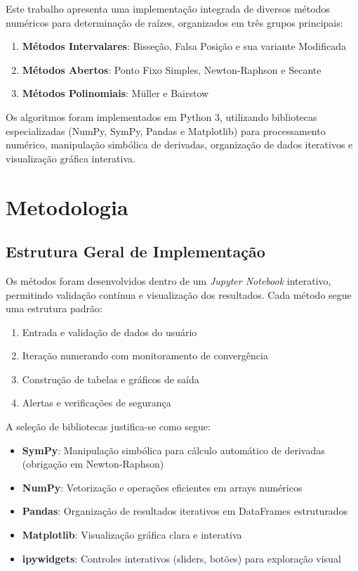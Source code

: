 \documentclass[
	12pt,				%
	openright,			%
	oneside,			%
	a4paper,			%
	english,			%
	brazil				%
	]{abntex2}
\begin{document}
Este trabalho apresenta uma implementação integrada de diversos métodos numéricos para determinação de raízes, organizados em três grupos principais:

\begin{enumerate}
    \item \textbf{Métodos Intervalares}: Bisseção, Falsa Posição e sua variante Modificada
    \item \textbf{Métodos Abertos}: Ponto Fixo Simples, Newton-Raphson e Secante
    \item \textbf{Métodos Polinomiais}: Müller e Bairstow
\end{enumerate}

Os algoritmos foram implementados em Python 3, utilizando bibliotecas especializadas (NumPy, SymPy, Pandas e Matplotlib) para processamento numérico, manipulação simbólica de derivadas, organização de dados iterativos e visualização gráfica interativa.

\chapter{Metodologia}

\section{Estrutura Geral de Implementação}

Os métodos foram desenvolvidos dentro de um \textit{Jupyter Notebook} interativo, permitindo validação contínua e visualização dos resultados. Cada método segue uma estrutura padrão:

\begin{enumerate}
    \item Entrada e validação de dados do usuário
    \item Iteração numerando com monitoramento de convergência
    \item Construção de tabelas e gráficos de saída
    \item Alertas e verificações de segurança
\end{enumerate}

A seleção de bibliotecas justifica-se como segue:

\begin{itemize}
    \item \textbf{SymPy}: Manipulação simbólica para cálculo automático de derivadas (obrigação em Newton-Raphson) \cite{sympy2024}
    \item \textbf{NumPy}: Vetorização e operações eficientes em arrays numéricos \cite{numpy2024}
    \item \textbf{Pandas}: Organização de resultados iterativos em DataFrames estruturados \cite{pandas2024}
    \item \textbf{Matplotlib}: Visualização gráfica clara e interativa \cite{matplotlib2024}
    \item \textbf{ipywidgets}: Controles interativos (sliders, botões) para exploração visual \cite{ipywidgets2024}
\end{itemize}
\end{document}
